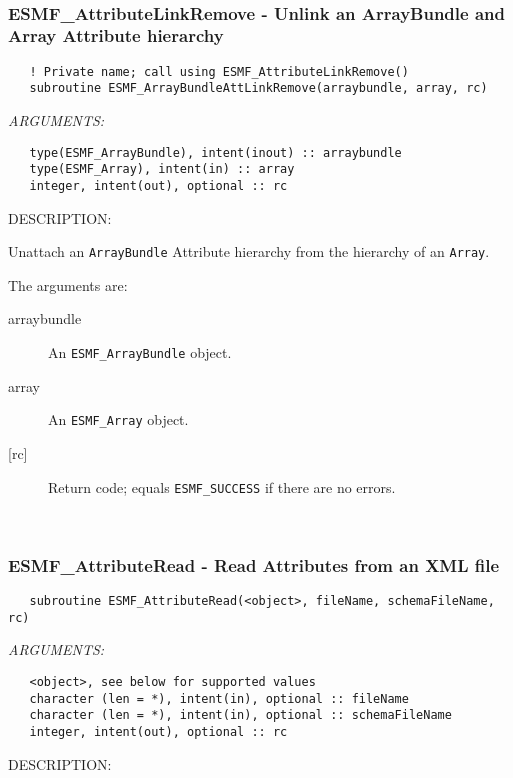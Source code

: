    
 
\mbox{}\hrulefill\ 
 
\subsubsection [ESMF\_AttributeLinkRemove] {ESMF\_AttributeLinkRemove - Unlink an ArrayBundle and Array Attribute hierarchy}


  
\begin{verbatim}   ! Private name; call using ESMF_AttributeLinkRemove()
   subroutine ESMF_ArrayBundleAttLinkRemove(arraybundle, array, rc)\end{verbatim}{\em ARGUMENTS:}
\begin{verbatim}   type(ESMF_ArrayBundle), intent(inout) :: arraybundle
   type(ESMF_Array), intent(in) :: array
   integer, intent(out), optional :: rc\end{verbatim}
{\sf DESCRIPTION:\\ }


   Unattach an {\tt ArrayBundle} Attribute hierarchy from the hierarchy of
   an {\tt Array}.
  
   The arguments are:
   \begin{description}
   \item [arraybundle]
   An {\tt ESMF\_ArrayBundle} object.
   \item [array]
   An {\tt ESMF\_Array} object.
   \item [{[rc]}]
   Return code; equals {\tt ESMF\_SUCCESS} if there are no errors.
   \end{description}
  
   
 
\mbox{}\hrulefill\ 
 
\subsubsection [ESMF\_AttributeRead] {ESMF\_AttributeRead - Read Attributes from an XML file}


   \label{api:AttributeRead}
  
\begin{verbatim}   subroutine ESMF_AttributeRead(<object>, fileName, schemaFileName, rc)\end{verbatim}{\em ARGUMENTS:}
\begin{verbatim}   <object>, see below for supported values
   character (len = *), intent(in), optional :: fileName
   character (len = *), intent(in), optional :: schemaFileName
   integer, intent(out), optional :: rc\end{verbatim}
{\sf DESCRIPTION:\\ }


